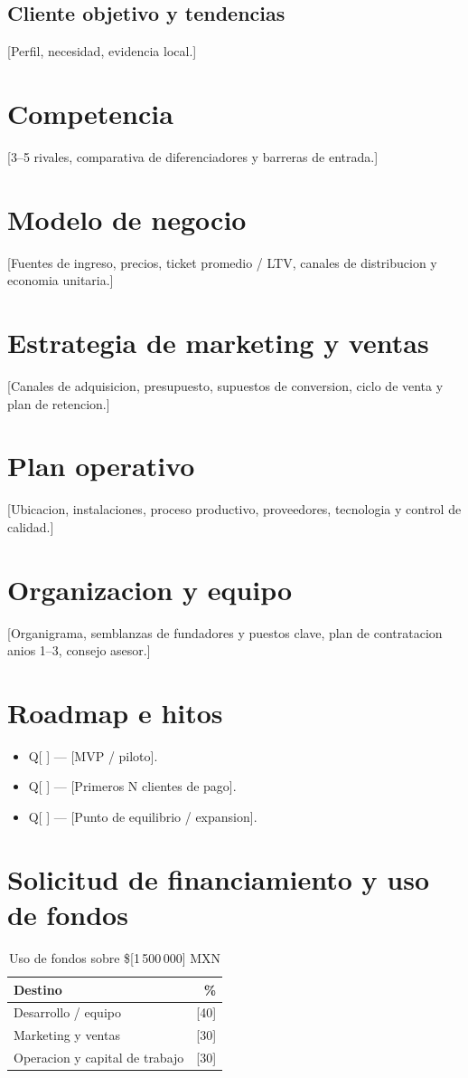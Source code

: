 \documentclass[12pt]{article}
\newcommand{\MontoSolicitado}{[1\,500\,000]}
\newcommand{\Moneda}{MXN}
\begin{document}
\subsection{Cliente objetivo y tendencias}
[Perfil, necesidad, evidencia local.]

\section{Competencia}
[3–5 rivales, comparativa de diferenciadores y barreras de entrada.]

\section{Modelo de negocio}
[Fuentes de ingreso, precios, ticket promedio / LTV, canales de
distribucion y economia unitaria.]

\section{Estrategia de marketing y ventas}
[Canales de adquisicion, presupuesto, supuestos de conversion, ciclo de
venta y plan de retencion.]

\section{Plan operativo}
[Ubicacion, instalaciones, proceso productivo, proveedores, tecnologia y
control de calidad.]

\section{Organizacion y equipo}
[Organigrama, semblanzas de fundadores y puestos clave, plan de
contratacion anios 1–3, consejo asesor.]

\section{Roadmap e hitos}
\begin{itemize}
  \item Q[ ] — [MVP / piloto].
  \item Q[ ] — [Primeros N clientes de pago].
  \item Q[ ] — [Punto de equilibrio / expansion].
\end{itemize}

\section{Solicitud de financiamiento y uso de fondos}
\begin{table}[h]
  \centering
  \caption{Uso de fondos sobre \$\MontoSolicitado{} \Moneda{}}
  \begin{tabular}{lr}
    \toprule
    Destino & \% \\
    \midrule
    Desarrollo / equipo & [40] \\
    Marketing y ventas & [30] \\
    Operacion y capital de trabajo & [30] \\
    \bottomrule
  \end{tabular}
\end{table}
\end{document}
